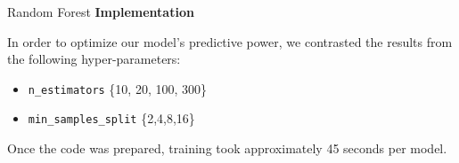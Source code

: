 \documentclass[titlepage,leqno]{beamer}%
\begin{document}
\begin{frame}[fragile]{Random Forest}
\small
\textbf{Implementation}

\medskip

In order to optimize our model's predictive power, we contrasted the results from the following hyper-parameters:
\begin{itemize}
    \item \verb+n_estimators+ \{10, 20, 100, 300\}
    \item \verb+min_samples_split+ \{2,4,8,16\}
\end{itemize}
\vspace{3.75mm}

Once the code was prepared, training took approximately 45 seconds per model.

\end{frame}
\end{document}
